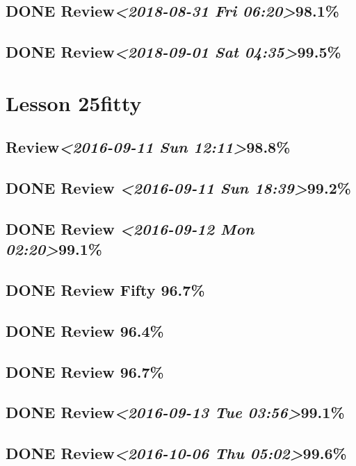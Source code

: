 \documentclass[11pt]{ctexart}
\begin{document}
\subsection{{\bfseries\sffamily DONE} Review\textit{<2018-08-31 Fri 06:20>}98.1\%}
\label{sec:orgb8db7fd}
\subsection{{\bfseries\sffamily DONE} Review\textit{<2018-09-01 Sat 04:35>}99.5\%}
\label{sec:org53a1ced}
\section{Lesson 25fitty}
\label{sec:org7896bb3}
\subsection{Review\textit{<2016-09-11 Sun 12:11>}98.8\%}
\label{sec:org8d3a058}
\subsection{{\bfseries\sffamily DONE} Review \textit{<2016-09-11 Sun 18:39>}99.2\%}
\label{sec:orga5f2c09}
\subsection{{\bfseries\sffamily DONE} Review \textit{<2016-09-12 Mon 02:20>}99.1\%}
\label{sec:org8b8fba1}
\subsection{{\bfseries\sffamily DONE} Review Fifty 96.7\%}
\label{sec:org96a5d1a}
\subsection{{\bfseries\sffamily DONE} Review 96.4\%}
\label{sec:orga85835e}
\subsection{{\bfseries\sffamily DONE} Review 96.7\%}
\label{sec:orge2d42cb}
\subsection{{\bfseries\sffamily DONE} Review\textit{<2016-09-13 Tue 03:56>}99.1\%}
\label{sec:org96c15ff}
\subsection{{\bfseries\sffamily DONE} Review\textit{<2016-10-06 Thu 05:02>}99.6\%}
\label{sec:org3aa76da}
\end{document}
